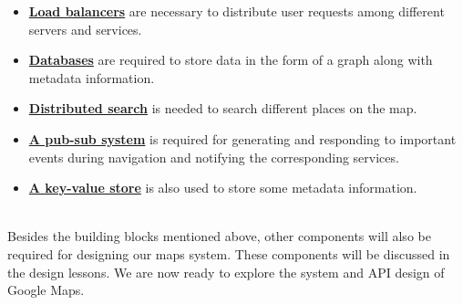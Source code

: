 \begin{itemize}
\item
\protect{}\label{zuru86sAIiisXf62kU1jl}
\href{https://www.educative.io/courses/grokking-the-system-design-interview/introduction-to-load-balancers}{\textbf{Load balancers}} are necessary to distribute user requests among different servers and services.
\item
\protect{}\label{fGHVMvU5AW1pY2hnCiyIy}
\href{https://www.educative.io/courses/grokking-the-system-design-interview/introduction-to-databases}{\textbf{Databases}} are required to store data in the form of a graph along with metadata information.
\item
\protect{}\label{84Ud2cMJUaSmcOCoWQGr2}
\href{https://www.educative.io/courses/grokking-the-system-design-interview/system-design-the-distributed-search}{\textbf{Distributed search}} is needed to search different places on the map.
\item
\protect{}\label{qBh2zTCKANREPa-mzmkmb}
\href{https://www.educative.io/courses/grokking-the-system-design-interview/system-design-the-pub-sub-abstraction}{\textbf{A pub-sub system}} is required for generating and responding to important events during navigation and notifying the corresponding services.
\item
\protect{}\label{XXXTXtRQTGv5ZIMcT3NCU}
\href{https://www.educative.io/courses/grokking-the-system-design-interview/system-design-the-key-value-store}{\textbf{A key-value store}} is also used to store some metadata information.
\end{itemize}
\\
Besides the building blocks mentioned above, other components will also be required for designing our maps system. These components will be discussed in the design lessons. We are now ready to explore the system and API design of Google Maps.

